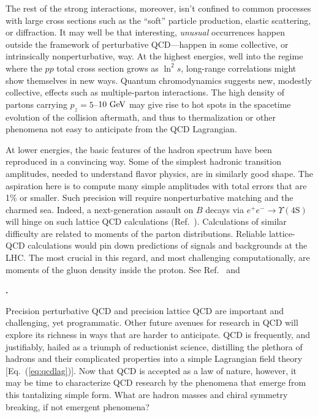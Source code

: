 \documentclass[prb,groupedaddress,nofootinbib,showpacs,twocolumn,floatfix]{revtex4}
\newcommand{\gev}{\hbox{ GeV}}
\newcommand{\Eqn}[1]{Eq.~(\ref{#1})}
\newcommand{\citentry}[1]{%
\par\addvspace{0.5em plus 0.05em minus 0.05em}%
\sloppy
\noindent\textbf{\onlinecite{#1}.}~\bibentry{#1}%
\par\addvspace{0.5em plus 0.05em minus 0.05em}
}
\begin{document}
The rest of the strong interactions, moreover, isn't confined to common  
processes with large cross sections such as the ``soft'' particle 
production, elastic scattering, or diffraction.
It may well be that interesting, \textit{unusual} occurrences happen 
outside the framework of perturbative QCD---happen in some collective, 
or intrinsically nonperturbative, way.
At the highest energies, well into the regime where the $pp$ total 
cross section grows as $\ln^2s$, long-range correlations might show 
themselves in new ways.
Quantum chromodynamics suggests new, modestly collective, effects such 
as multiple-parton interactions.
The high density of partons carrying $p_z=5$--$10\gev$ may give rise to 
hot spots in the spacetime evolution of the collision aftermath, and 
thus to thermalization or other phenomena not easy to anticipate from 
the QCD Lagrangian.

At lower energies, the basic features of the hadron spectrum have been 
reproduced in a convincing way.
Some of the simplest hadronic transition amplitudes, needed to understand 
flavor physics, are in similarly good shape.
The aspiration here is to compute many simple amplitudes with total errors 
that are 1\% or smaller.
Such precision will require nonperturbative matching and the charmed 
sea.
Indeed, a next-generation assault on $B$ decays via 
$e^+e^-\to\Upsilon(\mathrm{4S})$ will hinge on such lattice QCD 
calculations (Ref.~).
Calculations of similar difficulty are related to moments of the parton 
distributions.
Reliable lattice-QCD calculations would pin down predictions of signals 
and backgrounds at the LHC.
The most crucial in this regard, and most challenging computationally, 
are moments of the gluon density inside the proton.
See Ref.~ and
\citentry{Renner:2010ks}

Precision perturbative QCD and precision lattice QCD are important and 
challenging, yet programmatic.
Other future avenues for research in QCD will explore its richness in 
ways that are harder to anticipate.
QCD is frequently, and justifiably, hailed as a triumph of reductionist 
science, distilling the plethora of hadrons and their complicated 
properties into a simple Lagrangian field theory [\Eqn{eq:qcdlag}].
Now that QCD is accepted as a law of nature, however, it may be time to 
characterize QCD research by the phenomena that emerge from 
this tantalizing simple form.
What are hadron masses and chiral symmetry breaking, if not emergent 
phenomena?
\end{document}
